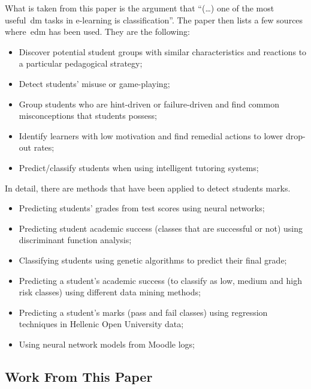 What is taken from this paper is the argument that ``(\dots) one of the most
useful~\gls{dm} tasks in e-learning is classification''. The paper then lists a
few sources where~\gls{edm} has been used. They are the following:

\begin{itemize}
    \item Discover potential student groups with similar characteristics and
        reactions to a particular pedagogical strategy;~\cite{ind_008}
    \item Detect students' misuse or game-playing; 
    \item Group students who are hint-driven or failure-driven and find common
        misconceptions that students possess; 
    \item Identify learners with low motivation and find remedial actions to
        lower drop-out rates; 
    \item Predict/classify students when using intelligent tutoring systems;
\end{itemize}

In detail, there are methods that have been applied to detect students marks.

\begin{itemize}
    \item Predicting students' grades from test scores using neural
        networks;~\cite{ind_009}
    \item Predicting student academic success (classes that are successful or
        not) using discriminant function analysis; 
    \item Classifying students using genetic algorithms to predict their final
        grade; 
    \item Predicting a student's academic success (to classify as low, medium
        and high risk classes) using different data mining methods; 
    \item Predicting a student’s marks (pass and fail classes) using regression
        techniques in Hellenic Open University data; 
    \item Using neural network models from Moodle logs; 
\end{itemize}

\subsection{Work From This Paper}

